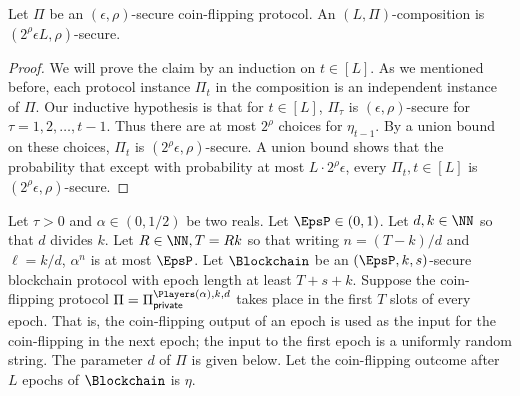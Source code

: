 \begin{lemma}\label{lemma:composition}
Let $\Pi$ be an $(\epsilon, \rho)$-secure coin-flipping protocol. 
An $(L, \Pi)$-composition is 
$\left(2^\rho \epsilon L, \rho\right)$-secure.
\end{lemma}
\begin{proof}
	We will prove the claim by an induction on $t \in [L]$. 
	As we mentioned before, each protocol instance $\Pi_t$ 
	in the composition is an independent instance of $\Pi$. 
	Our inductive hypothesis is that for $t \in [L]$, 
	$\Pi_\tau$ is $(\epsilon, \rho)$-secure for $\tau = 1, 2, \ldots, t-1$. 
	Thus there are at most $2^\rho$ choices for $\eta_{t - 1}$. 
	By a union bound on these choices, $\Pi_t$ is $(2^\rho \epsilon, \rho)$-secure. 
	A union bound shows that 
	the probability that 
	except with probability at most $L\cdot 2^\rho \epsilon$, 
	every $\Pi_t, t \in [L]$ is $(2^\rho \epsilon, \rho)$-secure.
\end{proof}




Let $\tau > 0$ and $\alpha \in (0, 1/2)$ be two reals. 
Let $\EpsP \in (0, 1)$. 
Let $d, k \in \NN$ 
so that $d$ divides $k$. 
Let $R \in \NN, T = Rk$ so that 
writing $n = (T - k)/d$ and $\ell = k/d$, 
$\alpha^n$ is at most $\EpsP$. 
Let $\Blockchain$ be an $(\EpsP, k, s)$-secure blockchain protocol 
with epoch length at least $T + s + k$. 
Suppose the	coin-flipping protocol $\Pi = \CoinTossingPrivate$ 
takes place in the first $T$ slots of every epoch. 
That is, the coin-flipping output of an epoch is used 
as the input for the coin-flipping in the next epoch; 
the input to the first epoch is a uniformly random string. 
The parameter $d$ of $\Pi$ is given below.
Let the coin-flipping outcome after $L$ epochs of $\Blockchain$ is $\eta$.

